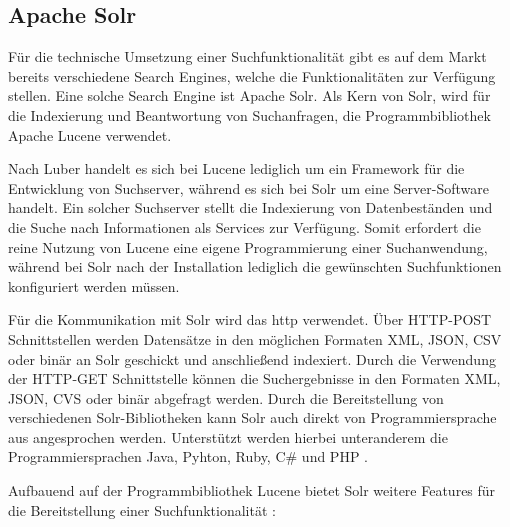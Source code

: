 \subsection{Apache Solr\label{subsec4.1.3:Unterunterpunkt-3}}

Für die technische Umsetzung einer Suchfunktionalität gibt es auf dem Markt bereits verschiedene Search Engines, welche die Funktionalitäten zur Verfügung stellen. Eine solche Search Engine ist \glqq Apache Solr\grqq{}. Als Kern von Solr, wird für die Indexierung und Beantwortung von Suchanfragen, die Programmbibliothek \glqq Apache Lucene\grqq{} verwendet.

Nach Luber \cite{StefanLuber.2018b} handelt es sich bei Lucene lediglich um ein Framework für die Entwicklung von Suchserver, während es sich bei Solr um eine Server-Software handelt. Ein solcher Suchserver stellt die Indexierung von Datenbeständen und die Suche nach Informationen als Services zur Verfügung. Somit erfordert die reine Nutzung von Lucene eine eigene Programmierung einer Suchanwendung, während bei Solr nach der Installation lediglich die gewünschten Suchfunktionen konfiguriert werden müssen.

Für die Kommunikation mit Solr wird das \gls{http} verwendet. Über HTTP-POST Schnittstellen werden Datensätze in den möglichen Formaten XML, JSON, CSV oder binär an Solr geschickt und anschließend indexiert. Durch die Verwendung der HTTP-GET Schnittstelle können die Suchergebnisse in den Formaten XML, JSON, CVS oder binär abgefragt werden. Durch die Bereitstellung von verschiedenen Solr-Bibliotheken kann Solr auch direkt von Programmiersprache aus angesprochen werden. Unterstützt werden hierbei unteranderem die Programmiersprachen Java, Pyhton, Ruby, C\# und PHP \cite{SematextGroup.2021}.

Aufbauend auf der Programmbibliothek Lucene bietet Solr weitere Features für die Bereitstellung einer Suchfunktionalität \cite{ApacheSoftwareFoundation.2021b}:


